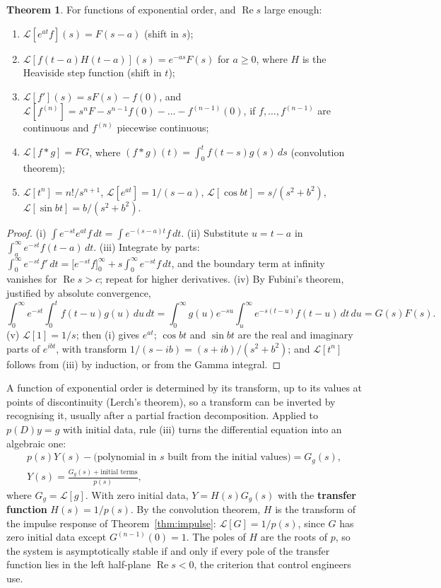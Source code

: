 \documentclass[11pt,a4paper]{article}
\numberwithin{equation}{section}
\DeclareMathOperator{\Real}{Re}
\theoremstyle{definition}
\newtheorem{thm}{Theorem}[subsection]
\begin{document}
\begin{thm}
\label{thm:laplace}
For functions of exponential order, and $\Real s$ large enough:
\begin{enumerate}[label=(\roman*)]
\item $\mathcal L[e^{at}f](s) = F(s - a)$ (shift in $s$);
\item $\mathcal L[f(t - a)H(t - a)](s) = e^{-as}F(s)$ for $a \geq 0$, where $H$ is the Heaviside step function (shift in $t$);
\item $\mathcal L[f'](s) = sF(s) - f(0)$, and $\mathcal L[f^{(n)}] = s^nF - s^{n-1}f(0) - \dots - f^{(n-1)}(0)$, if $f, \dots, f^{(n-1)}$ are continuous and $f^{(n)}$ piecewise continuous;
\item $\mathcal L[f * g] = FG$, where $(f * g)(t) = \int_0^tf(t - s)g(s)\,ds$ (convolution theorem);
\item $\mathcal L[t^n] = n!/s^{n+1}$, $\mathcal L[e^{at}] = 1/(s - a)$, $\mathcal L[\cos bt] = s/(s^2 + b^2)$, $\mathcal L[\sin bt] = b/(s^2 + b^2)$.
\end{enumerate}
\end{thm}

\begin{proof}
(i) $\int e^{-st}e^{at}f\,dt = \int e^{-(s - a)t}f\,dt$. (ii) Substitute $u = t - a$ in $\int_a^\infty e^{-st}f(t - a)\,dt$. (iii) Integrate by parts: $\int_0^\infty e^{-st}f'\,dt = \bigl[e^{-st}f\bigr]_0^\infty + s\int_0^\infty e^{-st}f\,dt$, and
the boundary term at infinity vanishes for $\Real s > c$; repeat for higher derivatives. (iv) By Fubini's theorem, justified by absolute convergence,
\[
\int_0^\infty e^{-st}\int_0^tf(t - u)g(u)\,du\,dt = \int_0^\infty g(u)e^{-su}\int_u^\infty e^{-s(t - u)}f(t - u)\,dt\,du = G(s)F(s) .
\]
(v) $\mathcal L[1] = 1/s$; then (i) gives $e^{at}$; $\cos bt$ and $\sin bt$ are the real and imaginary parts of $e^{ibt}$, with transform $1/(s - ib) = (s + ib)/(s^2 + b^2)$; and $\mathcal L[t^n]$ follows from (iii) by
induction, or from the Gamma integral.
\end{proof}

A function of exponential order is determined by its transform, up to its values at points of discontinuity (Lerch's theorem), so a transform can be inverted by recognising it,
usually after a partial fraction decomposition. Applied to $p(D)y = g$ with initial data, rule (iii) turns the differential equation into an algebraic one:
\begin{gather*}
p(s)Y(s) - \bigl(\text{polynomial in } s \text{ built from the initial values}\bigr) = G_g(s),\\
Y(s) = \frac{G_g(s) + \text{initial terms}}{p(s)} ,
\end{gather*}
where $G_g = \mathcal L[g]$. With zero initial data, $Y = H(s)G_g(s)$ with the \textbf{transfer function} $H(s) = 1/p(s)$. By the convolution theorem, $H$ is the transform of the impulse response
of Theorem~\ref{thm:impulse}: $\mathcal L[G] = 1/p(s)$, since $G$ has zero initial data except $G^{(n-1)}(0) = 1$. The poles of $H$ are the roots of $p$, so the system is asymptotically stable if and only
if every pole of the transfer function lies in the left half-plane $\Real s < 0$, the criterion that control engineers use.
\end{document}
